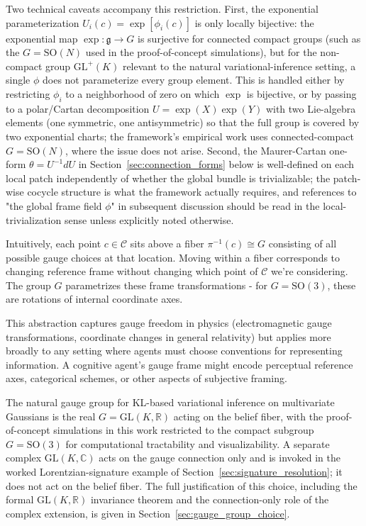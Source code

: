 \documentclass[11pt]{article}
\begin{document}
Two technical caveats accompany this restriction. First, the exponential parameterization $U_i(c) = \exp[\phi_i(c)]$ is only locally bijective: the exponential map $\exp: \mathfrak{g} \to G$ is surjective for connected compact groups (such as the $G = \mathrm{SO}(N)$ used in the proof-of-concept simulations), but for the non-compact group $\mathrm{GL}^+(K)$ relevant to the natural variational-inference setting, a single $\phi$ does not parameterize every group element. This is handled either by restricting $\phi_i$ to a neighborhood of zero on which $\exp$ is bijective, or by passing to a polar/Cartan decomposition $U = \exp(X)\exp(Y)$ with two Lie-algebra elements (one symmetric, one antisymmetric) so that the full group is covered by two exponential charts; the framework's empirical work uses connected-compact $G = \mathrm{SO}(N)$, where the issue does not arise. Second, the Maurer-Cartan one-form $\theta = U^{-1}dU$ in Section~\ref{sec:connection_forms} below is well-defined on each local patch independently of whether the global bundle is trivializable; the patch-wise cocycle structure is what the framework actually requires, and references to "the global frame field $\phi$" in subsequent discussion should be read in the local-trivialization sense unless explicitly noted otherwise.

Intuitively, each point $c \in \mathcal{C}$ sits above a fiber $\pi^{-1}(c) \cong G$ consisting of all possible gauge choices at that location. Moving within a fiber corresponds to changing reference frame without changing which point of $\mathcal{C}$ we're considering. The group $G$ parametrizes these frame transformations - for $G = \mathrm{SO}(3)$, these are rotations of internal coordinate axes.

This abstraction captures gauge freedom in physics (electromagnetic gauge transformations, coordinate changes in general relativity) but applies more broadly to any setting where agents must choose conventions for representing information. A cognitive agent's gauge frame might encode perceptual reference axes, categorical schemes, or other aspects of subjective framing.

The natural gauge group for KL-based variational inference on multivariate Gaussians is the real $G = \mathrm{GL}(K, \mathbb{R})$ acting on the belief fiber, with the proof-of-concept simulations in this work restricted to the compact subgroup $G = \mathrm{SO}(3)$ for computational tractability and visualizability. A separate complex $\mathrm{GL}(K, \mathbb{C})$ acts on the gauge connection only and is invoked in the worked Lorentzian-signature example of Section~\ref{sec:signature_resolution}; it does not act on the belief fiber. The full justification of this choice, including the formal $\mathrm{GL}(K, \mathbb{R})$ invariance theorem and the connection-only role of the complex extension, is given in Section~\ref{sec:gauge_group_choice}.
\end{document}
